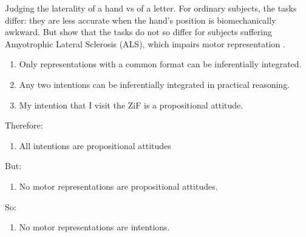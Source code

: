 \documentclass[12pt]{extarticle}
\begin{document}
\begin{multicols*}{3}
Judging the laterality of a hand vs of a letter.
For ordinary subjects, the tasks differ: they are less accurate
when the hand's position is biomechanically awkward.
But \citet{Fiori:2012fk} show that the tasks do not so differ for subjects suffering Amyotrophic
Lateral Sclerosis (ALS), which impairs motor representation \citep{parsons:1998_cerebrally}.

\begin{enumerate}
\item Only representations with a common format can be inferentially integrated.
\item Any two intentions can be inferentially integrated in practical reasoning.
\item My intention that I visit the ZiF is a propositional attitude.
\end{enumerate}
Therefore:
\begin{enumerate}[resume]
\item  All intentions are propositional attitudes
\end{enumerate}
But:
\begin{enumerate}[resume]
\item No motor representations are propositional attitudes.
\end{enumerate}
So:
\begin{enumerate}[resume]
\item No motor representations are intentions.
\end{enumerate}

    


\footnotesize
\setlength{\bibsep}{6pt}


\end{multicols*}
\end{document}
